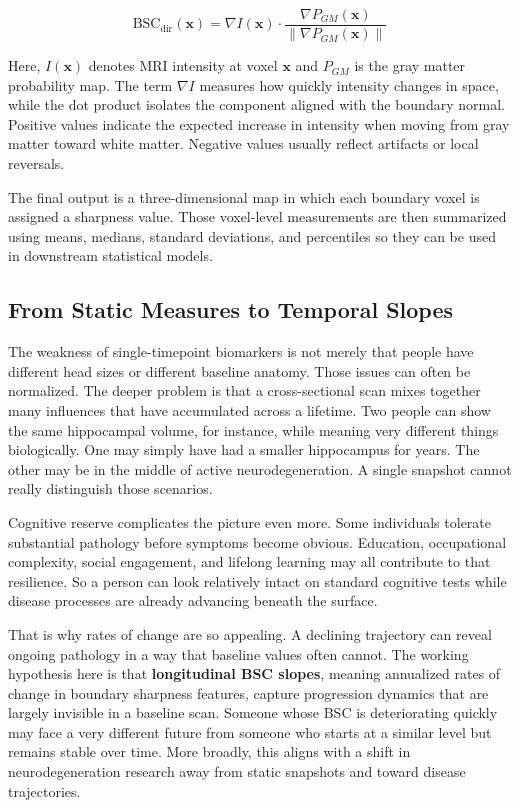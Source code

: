 \documentclass[blue]{ludusofficial}
\begin{document}
\begin{equation}
    \text{BSC}_{\text{dir}}(\mathbf{x}) = \nabla I(\mathbf{x}) \cdot \frac{\nabla P_{GM}(\mathbf{x})}{\|\nabla P_{GM}(\mathbf{x})\|}
\end{equation}

Here, $I(\mathbf{x})$ denotes MRI intensity at voxel $\mathbf{x}$ and $P_{GM}$ is the gray matter probability map. The term $\nabla I$ measures how quickly intensity changes in space, while the dot product isolates the component aligned with the boundary normal. Positive values indicate the expected increase in intensity when moving from gray matter toward white matter. Negative values usually reflect artifacts or local reversals.

The final output is a three-dimensional map in which each boundary voxel is assigned a sharpness value. Those voxel-level measurements are then summarized using means, medians, standard deviations, and percentiles so they can be used in downstream statistical models.

\subsection{From Static Measures to Temporal Slopes}

The weakness of single-timepoint biomarkers is not merely that people have different head sizes or different baseline anatomy. Those issues can often be normalized. The deeper problem is that a cross-sectional scan mixes together many influences that have accumulated across a lifetime. Two people can show the same hippocampal volume, for instance, while meaning very different things biologically. One may simply have had a smaller hippocampus for years. The other may be in the middle of active neurodegeneration. A single snapshot cannot really distinguish those scenarios.

Cognitive reserve complicates the picture even more. Some individuals tolerate substantial pathology before symptoms become obvious. Education, occupational complexity, social engagement, and lifelong learning may all contribute to that resilience. So a person can look relatively intact on standard cognitive tests while disease processes are already advancing beneath the surface.

That is why rates of change are so appealing. A declining trajectory can reveal ongoing pathology in a way that baseline values often cannot. The working hypothesis here is that \textbf{longitudinal BSC slopes}, meaning annualized rates of change in boundary sharpness features, capture progression dynamics that are largely invisible in a baseline scan. Someone whose BSC is deteriorating quickly may face a very different future from someone who starts at a similar level but remains stable over time. More broadly, this aligns with a shift in neurodegeneration research away from static snapshots and toward disease trajectories.
\end{document}
